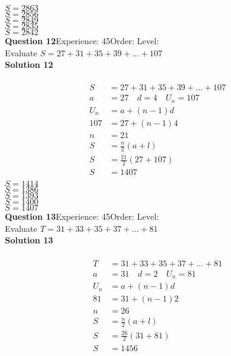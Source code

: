 \documentclass{article}
\begin{document}
$S=2863$\\
$S=2856$\\
$S=2849$\\
$S=2835$\\
$S=2842$\\
\noindent\textbf{Question 12}\hspace{20pt}Experience: 45\hspace{20pt}Order: \hspace{20pt}Level: \\[2pt]
Evaluate $S=27+31+35+39+...+107$\\[4pt]
\noindent\textbf{Solution 12}\\[2pt]
\\[-10pt]\begin{align*}
S&=27+31+35+39+...+107\\[2pt]
a&=27\quad d=4 \quad U_n=107\\[2pt]
U_n&=a+(n-1)d\\[2pt]
107&=27+(n-1)4\\[2pt]
n&=21\\[12pt]
S&=\displaystyle\frac{n}{2}(a+l)\\[2pt]
S&=\displaystyle\frac{21}{2}(27+107)\\[2pt]
S&=1407\\[-140pt]
\end{align*}
$S=1414$\\
$S=1386$\\
$S=1393$\\
$S=1400$\\
$S=1407$\\
\noindent\textbf{Question 13}\hspace{20pt}Experience: 45\hspace{20pt}Order: \hspace{20pt}Level: \\[2pt]
Evaluate $T=31+33+35+37+...+81$\\[4pt]
\noindent\textbf{Solution 13}\\[2pt]
\\[-10pt]\begin{align*}
T&=31+33+35+37+...+81\\[2pt]
a&=31\quad d=2 \quad U_n=81\\[2pt]
U_n&=a+(n-1)d\\[2pt]
81&=31+(n-1)2\\[2pt]
n&=26\\[12pt]
S&=\displaystyle\frac{n}{2}(a+l)\\[2pt]
S&=\displaystyle\frac{26}{2}(31+81)\\[2pt]
S&=1456\\[-140pt]
\end{align*}
\end{document}
